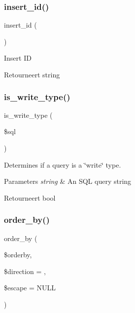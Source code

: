 \subsubsection{\texorpdfstring{insert\_id()}{insert\_id()}}
{\footnotesize\ttfamily insert\+\_\+id (\begin{DoxyParamCaption}{ }\end{DoxyParamCaption})}

Insert ID

\begin{DoxyReturn}{Retourneert}
string 
\end{DoxyReturn}
\mbox{\label{class_c_i___d_b__postgre__driver_af435df5703c238769d6d16fde6d51182}} 
\subsubsection{\texorpdfstring{is\_write\_type()}{is\_write\_type()}}
{\footnotesize\ttfamily is\+\_\+write\+\_\+type (\begin{DoxyParamCaption}\item[{}]{\$sql }\end{DoxyParamCaption})}

Determines if a query is a \char`\"{}write\char`\"{} type.


\begin{DoxyParams}{Parameters}
{\em string} & An S\+QL query string \\
\hline
\end{DoxyParams}
\begin{DoxyReturn}{Retourneert}
bool 
\end{DoxyReturn}
\mbox{\label{class_c_i___d_b__postgre__driver_a6d1ce6a3b22187165ce7d710ce91841d}} 
\subsubsection{\texorpdfstring{order\_by()}{order\_by()}}
{\footnotesize\ttfamily order\+\_\+by (\begin{DoxyParamCaption}\item[{}]{\$orderby,  }\item[{}]{\$direction = {\ttfamily \textquotesingle{}\textquotesingle{}},  }\item[{}]{\$escape = {\ttfamily NULL} }\end{DoxyParamCaption})}

